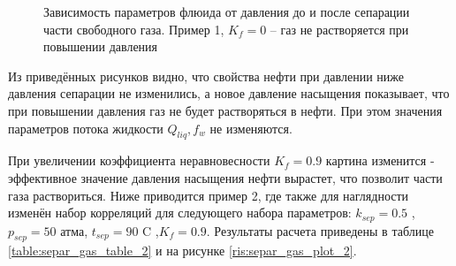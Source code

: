 \begin{figure}[ht]
\caption{Зависимость параметров флюида от давления до и после сепарации части свободного газа. Пример 1, $K_f=0$ -- газ не растворяется при повышении давления}
\label{ris:separ_gas_plot_1}
\end{figure}

Из приведённых рисунков видно, что свойства нефти при давлении ниже давления сепарации не изменились, а новое давление насыщения показывает, что при повышении давления газ не будет растворяться в нефти. При этом значения параметров потока жидкости $Q_{liq}, f_w$ не изменяются.

При увеличении коэффициента неравновесности $K_f=0.9$ картина изменится - эффективное значение давления насыщения нефти вырастет, что позволит части газа раствориться. Ниже приводится пример 2, где также для наглядности изменён набор корреляций для следующего набора параметров: $k_{sep} = 0.5$ ,$p_{sep} = 50$   атма,	$t_{sep} = 90$   C ,$K_f = 0.9 $. Результаты расчета приведены в таблице \ref{table:separ_gas_table_2} и на   рисунке \ref{ris:separ_gas_plot_2}.

